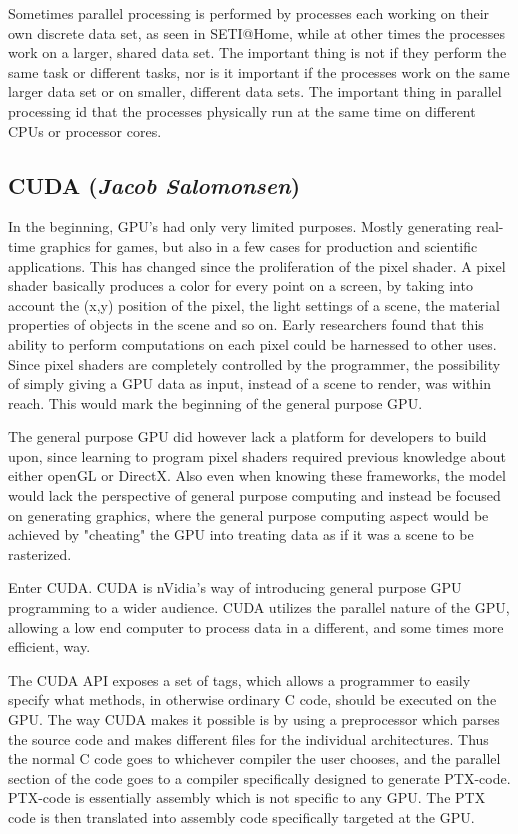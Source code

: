 Sometimes parallel processing is performed by processes each working on their own discrete data set, as seen in SETI@Home, while at other times the processes work on a larger, shared data set. The important thing is not if they perform the same task or different tasks, nor is it important if the processes work on the same larger data set or on smaller, different data sets. The important thing in parallel processing id that the processes physically run at the same time on different CPUs or processor cores.

\subsection{CUDA (\textit{Jacob Salomonsen})}
In the beginning, GPU's had only very limited purposes. Mostly generating real-time graphics for games, but also in a few cases for production and scientific applications. This has changed since the proliferation of the pixel shader. A pixel shader basically produces a color for every point on a screen, by taking into account the (x,y) position of the pixel, the light settings of a scene, the material properties of objects in the scene and so on. Early researchers found that this ability to perform computations on each pixel could be harnessed to other uses. Since pixel shaders are completely controlled by the programmer, the possibility of simply giving a GPU data as input, instead of a scene to render, was within reach. This would mark the beginning of the general purpose GPU.

The general purpose GPU did however lack a platform for developers to build upon, since learning to program pixel shaders required previous knowledge about either openGL or DirectX. Also even when knowing these frameworks, the model would lack the perspective of general purpose computing and instead be focused on generating graphics, where the general purpose computing aspect would be achieved by "cheating" the GPU into treating data as if it was a scene to be rasterized.

Enter CUDA. CUDA is nVidia's way of introducing general purpose GPU programming to a wider audience. CUDA utilizes the parallel nature of the GPU, allowing a low end computer to process data in a different, and some times more efficient, way.

The CUDA API exposes a set of tags, which allows a programmer to easily specify what methods, in otherwise ordinary C code, should be executed on the GPU. The way CUDA makes it possible is by using a preprocessor which parses the source code and makes different files for the individual architectures. Thus the normal C code goes to whichever compiler the user chooses, and the parallel section of the code goes to a compiler specifically designed to generate PTX-code. PTX-code is essentially assembly which is not specific to any GPU. The PTX code is then translated into assembly code specifically targeted at the GPU.

